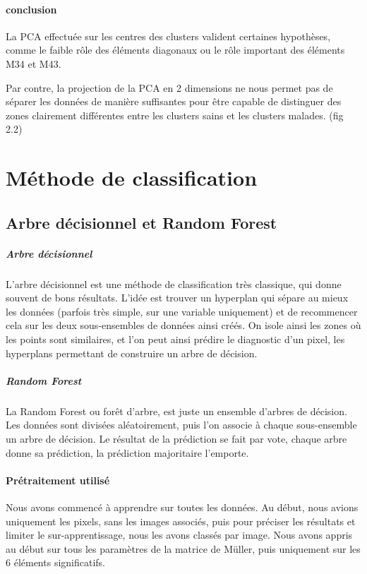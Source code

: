 \documentclass[a4paper,10pt]{report}
\begin{document}
\paragraph{conclusion}
La PCA effectuée sur les centres des clusters valident certaines hypothèses, comme le faible rôle des éléments diagonaux ou le rôle important des éléments M34 et M43.

Par contre, la projection de la PCA en 2 dimensions ne nous permet pas de séparer les données de manière suffisantes pour être capable de distinguer des zones clairement différentes entre les clusters sains et les clusters malades. (fig 2.2)


\section{Méthode de classification}

\subsection{Arbre décisionnel et Random Forest}
\subparagraph{Arbre décisionnel} 
L'arbre décisionnel est une méthode de classification très classique, qui donne souvent de bons résultats. L'idée est trouver un hyperplan qui sépare au mieux les données (parfois très simple, sur une variable uniquement) et de recommencer cela sur les deux sous-ensembles de données ainsi créés. On isole ainsi les zones où les points sont similaires, et l'on peut ainsi prédire le diagnostic d'un pixel, les hyperplans permettant de construire un arbre de décision.
\subparagraph{Random Forest}
La Random Forest ou forêt d'arbre, est juste un ensemble d'arbres de décision. Les données sont divisées aléatoirement, puis l'on associe à chaque sous-ensemble un arbre de décision. Le résultat de la prédiction se fait par vote, chaque arbre donne sa prédiction, la prédiction majoritaire l'emporte.
\paragraph{Prétraitement utilisé}
Nous avons commencé à apprendre sur toutes les données. Au début, nous avions uniquement les pixels, sans les images associés, puis pour préciser les résultats et limiter le sur-apprentissage, nous les avons classés par image. Nous avons appris au début sur tous les paramètres de la matrice de Müller, puis uniquement sur les 6 éléments significatifs.
\end{document}
